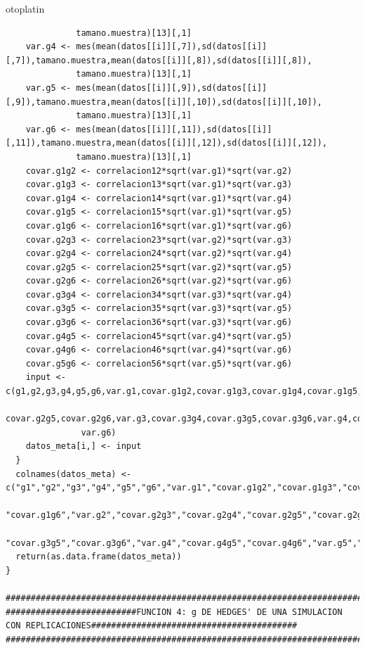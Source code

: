 otoplatin\documentclass[a4paper,openright,12pt]{report}
\begin{document}
{\begin{verbatim}
              tamano.muestra)[13][,1]
    var.g4 <- mes(mean(datos[[i]][,7]),sd(datos[[i]][,7]),tamano.muestra,mean(datos[[i]][,8]),sd(datos[[i]][,8]),
              tamano.muestra)[13][,1]
    var.g5 <- mes(mean(datos[[i]][,9]),sd(datos[[i]][,9]),tamano.muestra,mean(datos[[i]][,10]),sd(datos[[i]][,10]),
              tamano.muestra)[13][,1]
    var.g6 <- mes(mean(datos[[i]][,11]),sd(datos[[i]][,11]),tamano.muestra,mean(datos[[i]][,12]),sd(datos[[i]][,12]),
              tamano.muestra)[13][,1]
    covar.g1g2 <- correlacion12*sqrt(var.g1)*sqrt(var.g2)
    covar.g1g3 <- correlacion13*sqrt(var.g1)*sqrt(var.g3)
    covar.g1g4 <- correlacion14*sqrt(var.g1)*sqrt(var.g4)
    covar.g1g5 <- correlacion15*sqrt(var.g1)*sqrt(var.g5)
    covar.g1g6 <- correlacion16*sqrt(var.g1)*sqrt(var.g6)
    covar.g2g3 <- correlacion23*sqrt(var.g2)*sqrt(var.g3)
    covar.g2g4 <- correlacion24*sqrt(var.g2)*sqrt(var.g4)
    covar.g2g5 <- correlacion25*sqrt(var.g2)*sqrt(var.g5)
    covar.g2g6 <- correlacion26*sqrt(var.g2)*sqrt(var.g6)
    covar.g3g4 <- correlacion34*sqrt(var.g3)*sqrt(var.g4)
    covar.g3g5 <- correlacion35*sqrt(var.g3)*sqrt(var.g5)
    covar.g3g6 <- correlacion36*sqrt(var.g3)*sqrt(var.g6)
    covar.g4g5 <- correlacion45*sqrt(var.g4)*sqrt(var.g5)
    covar.g4g6 <- correlacion46*sqrt(var.g4)*sqrt(var.g6)
    covar.g5g6 <- correlacion56*sqrt(var.g5)*sqrt(var.g6)
    input <- c(g1,g2,g3,g4,g5,g6,var.g1,covar.g1g2,covar.g1g3,covar.g1g4,covar.g1g5,covar.g1g6,var.g2,covar.g2g3,covar.g2g4,
               covar.g2g5,covar.g2g6,var.g3,covar.g3g4,covar.g3g5,covar.g3g6,var.g4,covar.g4g5,covar.g4g6,var.g5,covar.g5g6,
               var.g6)
    datos_meta[i,] <- input
  }
  colnames(datos_meta) <- c("g1","g2","g3","g4","g5","g6","var.g1","covar.g1g2","covar.g1g3","covar.g1g4","covar.g1g5",
                            "covar.g1g6","var.g2","covar.g2g3","covar.g2g4","covar.g2g5","covar.g2g6","var.g3","covar.g3g4",
                            "covar.g3g5","covar.g3g6","var.g4","covar.g4g5","covar.g4g6","var.g5","covar.g5g6","var.g6")
  return(as.data.frame(datos_meta))
}

##############################################################################################################################
##########################FUNCION 4: g DE HEDGES' DE UNA SIMULACION CON REPLICACIONES#########################################
##############################################################################################################################


\end{verbatim}}
\end{document}
